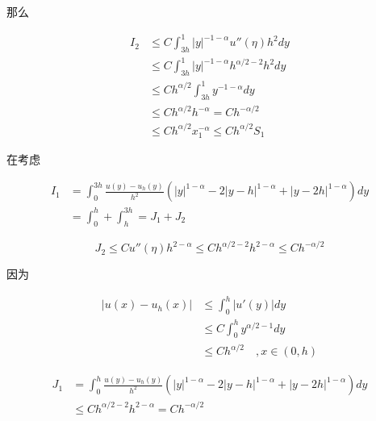 \documentclass{ctexart}
\begin{document}
那么

\begin{equation}
    \begin{aligned}
            I_2 &\le  C \int_{3h}^{1} |y|^{-1-\alpha} u''(\eta) h^2 dy   \\
            & \le  C \int_{3h}^{1} |y|^{-1-\alpha} h^{\alpha/2-2} h^2 dy    \\
            & \le C h^{\alpha/2}  \int_{3h}^{1} y^{-1-\alpha} dy  \\
            & \le C h^{\alpha/2} h^{-\alpha} = C h^{-\alpha/2}   \\
            & \le C h^{\alpha/2} x_1^{-\alpha} \le C h^{\alpha/2} S_1
    \end{aligned}
\end{equation}

在考虑

\begin{equation}
    \begin{aligned}
        I_1 &= \int_0^{3h}  \frac{ u(y) - u_h(y) }{h^2} (|y|^{1-\alpha} - 2|y-h|^{1-\alpha} + |y-2h|^{1-\alpha}) dy \\
        &= \int_0^h + \int_h^{3h} = J_1 + J_2
    \end{aligned}
\end{equation}

\begin{equation}
    J_2 \le C u''(\eta) h^{2-\alpha} \le C h^{\alpha/2-2} h^{2-\alpha} \le C h^{-\alpha/2}
\end{equation}

因为

\begin{equation}
    \begin{aligned}
        |u(x) - u_h(x)| &\le \int_0^h |u'(y)| dy    \\
        &\le C \int_0^h y^{\alpha/2-1} dy   \\
        &\le C h^{\alpha/2}    \quad , x\in (0, h)
    \end{aligned}
\end{equation}


\begin{equation}
    \begin{aligned}
        J_1 & = \int_0^h \frac{ u(y) - u_h(y) }{h^2} (|y|^{1-\alpha} - 2|y-h|^{1-\alpha} + |y-2h|^{1-\alpha}) dy \\
        &\le C h^{\alpha/2-2} h^{2-\alpha} = C h^{-\alpha/2}
    \end{aligned}
\end{equation}
\end{document}
